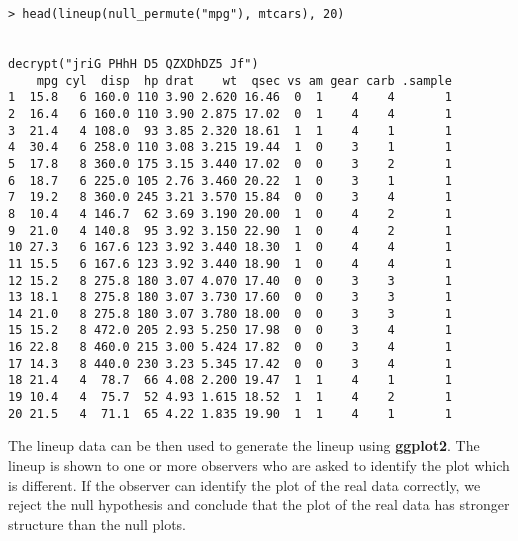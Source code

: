 \begin{verbatim}
> head(lineup(null_permute("mpg"), mtcars), 20)


decrypt("jriG PHhH D5 QZXDhDZ5 Jf")
    mpg cyl  disp  hp drat    wt  qsec vs am gear carb .sample
1  15.8   6 160.0 110 3.90 2.620 16.46  0  1    4    4       1
2  16.4   6 160.0 110 3.90 2.875 17.02  0  1    4    4       1
3  21.4   4 108.0  93 3.85 2.320 18.61  1  1    4    1       1
4  30.4   6 258.0 110 3.08 3.215 19.44  1  0    3    1       1
5  17.8   8 360.0 175 3.15 3.440 17.02  0  0    3    2       1
6  18.7   6 225.0 105 2.76 3.460 20.22  1  0    3    1       1
7  19.2   8 360.0 245 3.21 3.570 15.84  0  0    3    4       1
8  10.4   4 146.7  62 3.69 3.190 20.00  1  0    4    2       1
9  21.0   4 140.8  95 3.92 3.150 22.90  1  0    4    2       1
10 27.3   6 167.6 123 3.92 3.440 18.30  1  0    4    4       1
11 15.5   6 167.6 123 3.92 3.440 18.90  1  0    4    4       1
12 15.2   8 275.8 180 3.07 4.070 17.40  0  0    3    3       1
13 18.1   8 275.8 180 3.07 3.730 17.60  0  0    3    3       1
14 21.0   8 275.8 180 3.07 3.780 18.00  0  0    3    3       1
15 15.2   8 472.0 205 2.93 5.250 17.98  0  0    3    4       1
16 22.8   8 460.0 215 3.00 5.424 17.82  0  0    3    4       1
17 14.3   8 440.0 230 3.23 5.345 17.42  0  0    3    4       1
18 21.4   4  78.7  66 4.08 2.200 19.47  1  1    4    1       1
19 10.4   4  75.7  52 4.93 1.615 18.52  1  1    4    2       1
20 21.5   4  71.1  65 4.22 1.835 19.90  1  1    4    1       1

\end{verbatim}

The lineup data can be then used to generate the lineup using
\textbf{ggplot2}. The lineup is shown to one or more observers who are
asked to identify the plot which is different. If the observer can
identify the plot of the real data correctly, we reject the null
hypothesis and conclude that the plot of the real data has stronger
structure than the null plots. 

%

